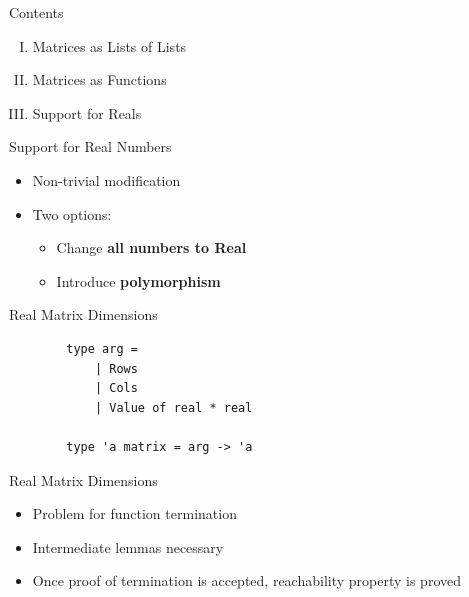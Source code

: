 \documentclass{beamer}
\begin{document}


\begin{frame}{Contents}
	\begin{enumerate}[I.]
		\item<0> Matrices as Lists of Lists
		\item<0> Matrices as Functions
		\item<1> Support for Reals
	\end{enumerate}
\end{frame}

\begin{frame}{Support for Real Numbers}
	\begin{itemize}
	\item Non-trivial modification
	\item Two options:

	\begin{itemize}
		\item<2->{Change \textbf{all numbers to Real}}
		\item<3->{Introduce \textbf{polymorphism}}
	\end{itemize}
	\end{itemize}
\end{frame}


\begin{frame}[fragile]{Real Matrix Dimensions}
	\begin{lstlisting}
		type arg =
			| Rows
			| Cols
			| Value of real * real
		
		type 'a matrix = arg -> 'a
	\end{lstlisting}
\end{frame}


\begin{frame}[fragile]{Real Matrix Dimensions}
	\begin{itemize}
		\item<1-> Problem for function termination
		\item<1-> Intermediate lemmas necessary
		\item<2-> Once proof of termination is accepted, reachability property is proved
	\end{itemize}
\end{frame}
\end{document}
